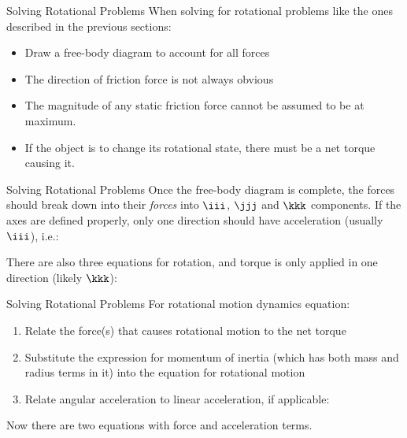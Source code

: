 \documentclass[12pt,compress,aspectratio=169]{beamer}
\begin{document}
\begin{frame}{Solving Rotational Problems}
  When solving for rotational problems like the ones described in the previous
  sections:
  \begin{itemize}
  \item Draw a free-body diagram to account for all forces
  \item The direction of friction force is not always obvious
  \item The magnitude of any static friction force cannot be assumed to be at
    maximum.
  \item If the object is to change its rotational state, there must be a net
    torque causing it.
  \end{itemize}
\end{frame}



\begin{frame}{Solving Rotational Problems}
  Once the free-body diagram is complete, the forces should break down into
  their \emph{forces} into $\iii$, $\jjj$ and $\kkk$ components. If the axes
  are defined properly, only one direction should have acceleration (usually
  $\iii$), i.e.:
  

  There are also three equations for rotation, and torque is only applied in
  one direction (likely $\kkk$):
    
\end{frame}



\begin{frame}{Solving Rotational Problems}
  For rotational motion dynamics equation:
  \begin{enumerate}
  \item Relate the force(s) that causes rotational motion to the net torque

  \item Substitute the expression for momentum of inertia (which has both mass
    and radius terms in it) into the equation for rotational motion
  \item Relate angular acceleration to linear acceleration, if applicable:

  \end{enumerate}
  Now there are two equations with force and acceleration terms.
\end{frame}
\end{document}
